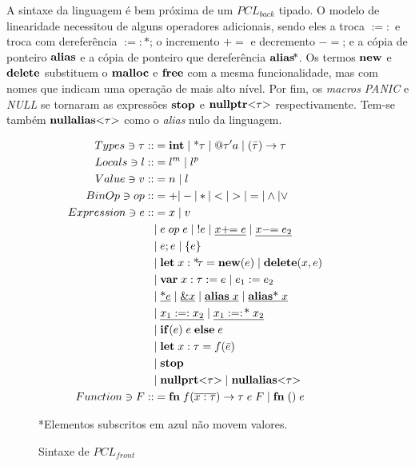 A sintaxe da linguagem é bem próxima de um $PCL_{back}$ tipado. O modelo de linearidade necessitou de alguns operadores adicionais, sendo eles a troca $:=:$ e troca com dereferência $:=:\!\!\text{*}$; o incremento $+\!\!=$ e decremento $-\!\!=$; e a cópia de ponteiro $\mathbf{alias}$ e a cópia de ponteiro que dereferência $\mathbf{alias}\!\text{*}$. Os termos $\mathbf{new}$ e $\mathbf{delete}$ substituem o $\mathbf{malloc}$ e $\mathbf{free}$ com a mesma funcionalidade, mas com nomes que indicam uma operação de mais alto nível. Por fim, os \emph{macros} \emph{PANIC} e \emph{NULL} se tornaram as expressões $\mathbf{stop}$ e $\mathbf{nullptr}\text{<}\tau\text{>}$ respectivamente. Tem-se também $\mathbf{nullalias}\text{<}\tau\text{>}$ como o \emph{alias} nulo da linguagem. 

\def\notmov#1{\color{blue}\underline{{\color{black}#1}}\color{black}}

\begin{figure}[ht]
	\caption{Sintaxe de $PCL_{front}$}
	\label{fig:pcl-front:sintax}
	\begin{align*}
		Types \ni \tau ::&= \KW{int} \OR \text{*}\tau \OR @\tau'a \OR (\bar\tau) \to \tau \\
		Locals \ni l ::&= l^m \OR l^p &&\\ 
		Value \ni v ::&= n \OR l && \\
		BinOp \ni op ::&= + | - | * | < | > | = | \land | \lor \\
		Expression \ni e ::&= x \OR v \\
		&\NLOR e\; op\; e \OR !e \OR \notmov{x +\!\!= e} \OR \notmov{x -\!\!= e_2}\\
		&\NLOR e;e \OR \{e\} \\ 
		&\NLOR \KW{let}\;x:\text{*}\!\tau = \KW{new}(e) \OR \KW{delete}(x, e) \; \\ 
		&\NLOR \KW{var}\; x: \tau := e \OR e_1 := e_2 \\
		&\NLOR \notmov{\text{*}e} \OR \notmov{\&x} \OR \notmov{\KW{alias} \; x} \OR \notmov{\KW{alias}\text{*} \; x}\\
		&\NLOR \notmov{x_1 :=: x_2} \OR \notmov{x_1 :=:\!\text{*}\;x_2}\\
		&\NLOR \KW{if}(e) \; e \; \KW{else} \; e\\
		&\NLOR \KW{let}\;x:\tau = f(\bar e) \\ 
		&\NLOR \KW{stop}\\ 
		&\NLOR \KW{nullprt}\typearg{\tau} \OR \KW{nullalias}\typearg{\tau}\\ 
		Function \ni F ::&= \KW{fn} \; f(\overline{x : \tau}) \to \tau \; e \; F \; | \; \KW{fn}\;() \; e \\
	\end{align*}
	\vspace{-4em}
	\begin{flushleft}
		\small
		{\color{red}*}Elementos subscritos em {\color{blue} azul} não movem valores.
	\end{flushleft}
\end{figure}

